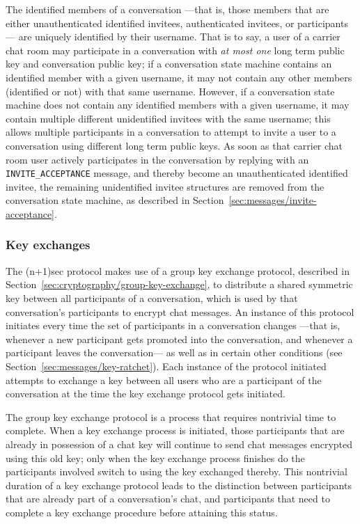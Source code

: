 \documentclass{article}
\def\message#1{\texttt{#1}}
\begin{document}
The identified members of a conversation ---that is, those members that are either unauthenticated identified invitees, authenticated invitees, or participants--- are uniquely identified by their username.
That is to say, a user of a carrier chat room may participate in a conversation with \emph{at most one} long term public key and conversation public key; if a conversation state machine contains an identified member with a given username, it may not contain any other members (identified or not) with that same username.
However, if a conversation state machine does not contain any identified members with a given username, it may contain multiple different unidentified invitees with the same username; this allows multiple participants in a conversation to attempt to invite a user to a conversation using different long term public keys.
As soon as that carrier chat room user actively participates in the conversation by replying with an \message{INVITE\_ACCEPTANCE} message, and thereby become an unauthenticated identified invitee, the remaining unidentified invitee structures are removed from the conversation state machine, as described in Section~\ref{sec:messages/invite-acceptance}.


\subsubsection{Key exchanges}
\label{sec:conversation-state-machine/contents/key-exchanges}

The (n+1)sec protocol makes use of a group key exchange protocol, described in Section~\ref{sec:cryptography/group-key-exchange}, to distribute a shared symmetric key between all participants of a conversation, which is used by that conversation's participants to encrypt chat messages.
An instance of this protocol initiates every time the set of participants in a conversation changes ---that is, whenever a new participant gets promoted into the conversation, and whenever a participant leaves the conversation--- as well as in certain other conditions (see Section~\ref{sec:messages/key-ratchet}).
Each instance of the protocol initiated attempts to exchange a key between all users who are a participant of the conversation at the time the key exchange protocol gets initiated.

The group key exchange protocol is a process that requires nontrivial time to complete.
When a key exchange process is initiated, those participants that are already in possession of a chat key will continue to send chat messages encrypted using this old key; only when the key exchange process finishes do the participants involved switch to using the key exchanged thereby.
This nontrivial duration of a key exchange protocol leads to the distinction between participants that are already part of a conversation's chat, and participants that need to complete a key exchange procedure before attaining this status.
\end{document}
